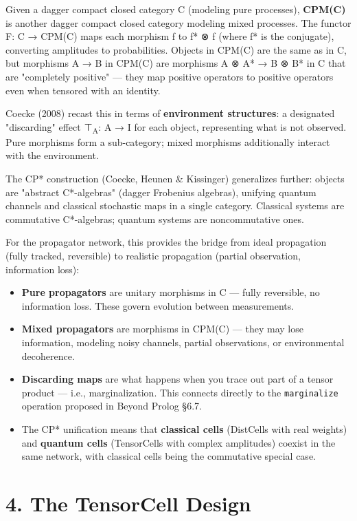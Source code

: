\documentclass[11pt]{article}
\begin{document}
Given a dagger compact closed category C (modeling pure processes), \textbf{CPM(C)} is
another dagger compact closed category modeling mixed processes. The functor
F: C → CPM(C) maps each morphism f to f* ⊗ f (where f* is the conjugate),
converting amplitudes to probabilities. Objects in CPM(C) are the same as in C,
but morphisms A → B in CPM(C) are morphisms A ⊗ A* → B ⊗ B* in C that are
"completely positive" --- they map positive operators to positive operators even
when tensored with an identity.

Coecke (2008) recast this in terms of \textbf{environment structures}: a designated
"discarding" effect ⊤\textsubscript{A}: A → I for each object, representing what is not
observed. Pure morphisms form a sub-category; mixed morphisms additionally
interact with the environment.

The CP* construction (Coecke, Heunen \& Kissinger) generalizes further: objects
are "abstract C*-algebras" (dagger Frobenius algebras), unifying quantum
channels and classical stochastic maps in a single category. Classical systems
are commutative C*-algebras; quantum systems are noncommutative ones.

For the propagator network, this provides the bridge from ideal propagation
(fully tracked, reversible) to realistic propagation (partial observation,
information loss):
\begin{itemize}
\item \textbf{Pure propagators} are unitary morphisms in C --- fully reversible, no
information loss. These govern evolution between measurements.
\item \textbf{Mixed propagators} are morphisms in CPM(C) --- they may lose information,
modeling noisy channels, partial observations, or environmental decoherence.
\item \textbf{Discarding maps} are what happens when you trace out part of a tensor
product --- i.e., marginalization. This connects directly to the
\texttt{marginalize} operation proposed in Beyond Prolog §6.7.
\item The CP* unification means that \textbf{classical cells} (DistCells with real weights)
and \textbf{quantum cells} (TensorCells with complex amplitudes) coexist in the same
network, with classical cells being the commutative special case.
\end{itemize}
\section{4. The TensorCell Design}
\label{sec:orgec0e1c6}
\end{document}
